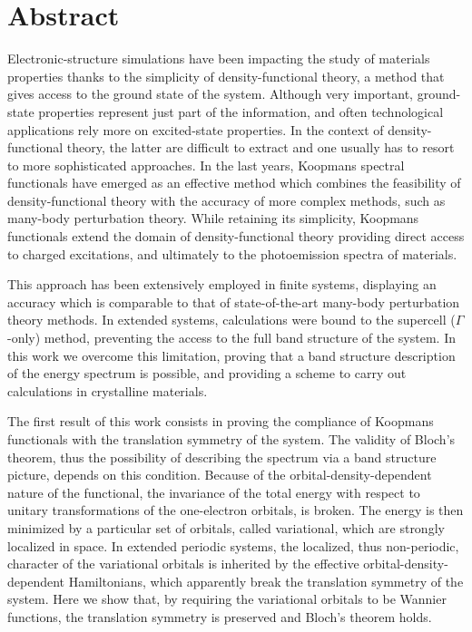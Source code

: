 \begingroup
\let\cleardoublepage\clearpage

\cleardoublepage
\chapter*{Abstract}
\vspace{2cm}
%

Electronic-structure simulations have been impacting the study of materials properties thanks to the simplicity of density-functional theory, a method that gives access to the ground state of the system. Although very important, ground-state properties represent just part of the information, and often technological applications rely more on excited-state properties. In the context of density-functional theory, the latter are difficult to extract and one usually has to resort to more sophisticated approaches. In the last years, Koopmans spectral functionals have emerged as an effective method which combines the feasibility of density-functional theory with the accuracy of more complex methods, such as many-body perturbation theory. While retaining its simplicity, Koopmans functionals extend the domain of density-functional theory providing direct access to charged excitations, and ultimately to the photoemission spectra of materials.

This approach has been extensively employed in finite systems, displaying an accuracy which is comparable to that of state-of-the-art many-body perturbation theory methods. In extended systems, calculations were bound to the supercell ($\Gamma$-only) method, preventing the access to the full band structure of the system. In this work we overcome this limitation, proving that a band structure description of the energy spectrum is possible, and providing a scheme to carry out calculations in crystalline materials.

The first result of this work consists in proving the compliance of Koopmans functionals with the translation symmetry of the system. The validity of Bloch's theorem, thus the possibility of describing the spectrum via a band structure picture, depends on this condition. Because of the orbital-density-dependent nature of the functional, the invariance of the total energy with respect to unitary transformations of the one-electron orbitals, is broken. The energy is then minimized by a particular set of orbitals, called variational, which are strongly localized in space. In extended periodic systems, the localized, thus non-periodic, character of the variational orbitals is inherited by the effective orbital-density-dependent Hamiltonians, which apparently break the translation symmetry of the system. Here we show that, by requiring the variational orbitals to be Wannier functions, the translation symmetry is preserved and Bloch's theorem holds.

